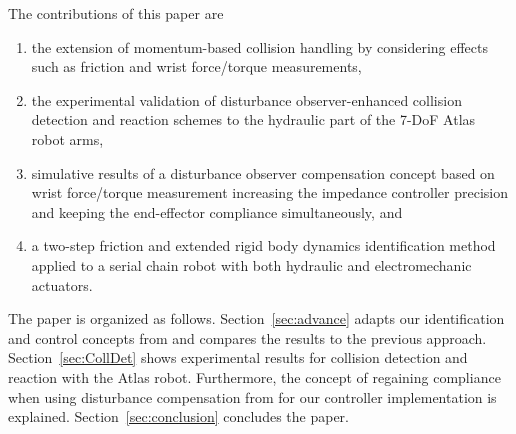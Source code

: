 The contributions of this paper are
\begin{enumerate}
\item the extension of momentum-based collision handling by considering effects such as friction and wrist force/torque measurements, %
\item the experimental validation of disturbance observer-enhanced collision detection and reaction schemes to the hydraulic part of the 7-DoF Atlas robot arms,
\item simulative results of a disturbance observer compensation concept based on wrist force/torque measurement increasing the impedance controller precision and keeping the end-effector compliance simultaneously, and
\item a two-step friction and extended rigid body dynamics identification method applied to a serial chain robot with both hydraulic and electromechanic actuators.
\end{enumerate}
The paper is organized as follows.
Section~\ref{sec:advance} adapts our identification and control concepts from \cite{SpVdTh14} and compares the results to the previous approach.
Section~\ref{sec:CollDet} shows experimental results for collision detection and reaction with the Atlas robot.
Furthermore, the concept of regaining compliance when using disturbance compensation from \cite{Oh1999} for our controller implementation is explained.
Section~\ref{sec:conclusion} concludes the paper.

